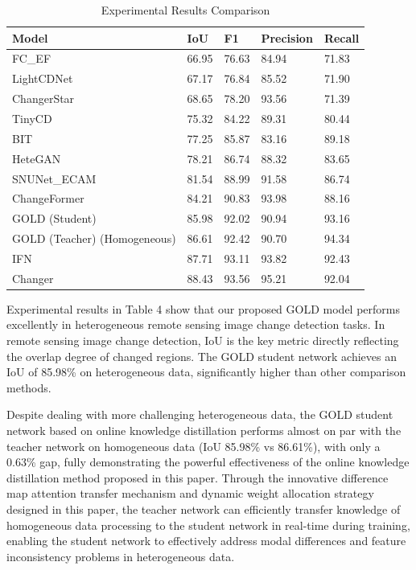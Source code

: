 \documentclass[a4paper,fleqn]{cas-dc}
\begin{document}
\begin{table}[htbp]
\centering
\caption{Experimental Results Comparison}
\begin{tabular}{lllll}
\hline
Model & IoU & F1 & Precision & Recall \\
\hline
FC\_EF & 66.95 & 76.63 & 84.94 & 71.83 \\
LightCDNet & 67.17 & 76.84 & 85.52 & 71.90 \\
ChangerStar & 68.65 & 78.20 & 93.56 & 71.39 \\
TinyCD & 75.32 & 84.22 & 89.31 & 80.44 \\
BIT & 77.25 & 85.87 & 83.16 & 89.18 \\
HeteGAN & 78.21 & 86.74 & 88.32 & 83.65 \\
SNUNet\_ECAM & 81.54 & 88.99 & 91.58 & 86.74 \\
ChangeFormer & 84.21 & 90.83 & 93.98 & 88.16 \\
GOLD (Student) & 85.98 & 92.02 & 90.94 & 93.16 \\
GOLD (Teacher) (Homogeneous) & 86.61 & 92.42 & 90.70 & 94.34 \\
IFN & 87.71 & 93.11 & 93.82 & 92.43 \\
Changer & 88.43 & 93.56 & 95.21 & 92.04 \\
\hline
\end{tabular}
\label{tab:results}
\end{table}

Experimental results in Table 4 show that our proposed GOLD model performs excellently in heterogeneous remote sensing image change detection tasks. In remote sensing image change detection, IoU is the key metric directly reflecting the overlap degree of changed regions. The GOLD student network achieves an IoU of 85.98\% on heterogeneous data, significantly higher than other comparison methods.

Despite dealing with more challenging heterogeneous data, the GOLD student network based on online knowledge distillation performs almost on par with the teacher network on homogeneous data (IoU 85.98\% vs 86.61\%), with only a 0.63\% gap, fully demonstrating the powerful effectiveness of the online knowledge distillation method proposed in this paper. Through the innovative difference map attention transfer mechanism and dynamic weight allocation strategy designed in this paper, the teacher network can efficiently transfer knowledge of homogeneous data processing to the student network in real-time during training, enabling the student network to effectively address modal differences and feature inconsistency problems in heterogeneous data.
\end{document}
